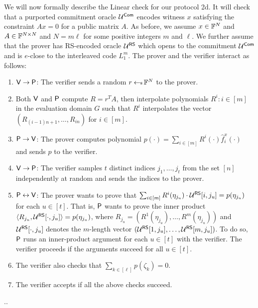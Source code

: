 We will now formally describe the Linear check for our protocol \name2d{}. It will check that a purported commitment oracle
$\mathcal{U}^{\mathsf{Com}}$ encodes witness $x$ satisfying the constraint $Ax=0$ for a public
matrix $A$. As before, we assume $x\in \mathbb{F}^N$ and $A\in \mathbb{F}^{N\times N}$ and
$N=m\ell$ for some positive integers $m$ and $\ell$. We further assume that
the prover has RS-encoded oracle $\mathcal{U}^{\mathsf{RS}}$ which opens to the commitment
$\mathcal{U}^{\mathsf{Com}}$ and is $e$-close to the interleaved code $L_1^{m}$. 
The prover and the verifier interact as follows:
\begin{enumerate}[{\rm 1.}]
\item $\mathsf{V}\rightarrow\mathsf{P}$: The verifier sends a random $r\hskip2.3pt{\gets\!\!\mbox{\tiny${\$}$\normalsize}}\,
\mathbb{F}^N$ to the prover.

\item Both $\mathsf{V}$ and $\mathsf{P}$ compute $R = r^T A$, then interpolate polynomials $R^i:i\in [m]$ in the evaluation domain $G$ such that $R^i$ interpolates the vector $(R_{(i-1)n+1},\ldots,R_{in})$ for $i\in [m]$. 

\item $\mathsf{P}\rightarrow\mathsf{V}$: The prover computes polynomial 
$p(\cdot)=\sum_{i\in [m]}R^i(\cdot)\hat{f}^x_{i}(\cdot)$ and sends $p$ to the verifier.

\item $\mathsf{V}\rightarrow\mathsf{P}$: The verifier samples $t$ distinct indices
$j_1,\ldots,j_t$ from the set $[n]$ independently at random and sends the indices to the prover.

\item $\mathsf{P}\leftrightarrow\mathsf{V}$: The prover wants to prove that 
$\sum_{i\in [m]} R^i(\eta_{j_u}) \cdot \mathcal{U}^{\mathsf{RS}}[i, j_u] = p(\eta_{j_u})$ for each $u \in [t]$.
That is, $\mathsf{P}$ wants to prove the inner product $\langle R_{j_u},\mathcal{U}^{\mathsf{RS}}[\cdot,j_u]\rangle = p(\eta_{j_u})$,
where $R_{j_u} = (R^1(\eta_{j_u}), \ldots, R^m(\eta_{j_u}))$ and 
$\mathcal{U}^{\mathsf{RS}}[\cdot, j_u]$ denotes the $m$-length vector $(\mathcal{U}^{\mathsf{RS}}[1, j_u], \ldots, \mathcal{U}^{\mathsf{RS}}[m, j_u])$.
To do so, $\mathsf{P}$ runs an inner-product argument for each $u \in [t]$ with the verifier. The verifier proceeds if the arguments succeed for all $u \in [t]$.

\item The verifier also checks that $\sum_{k\in [\ell]}p(\zeta_k)=0$.
\item The verifier accepts if all the above checks succeed.
\end{enumerate}
..


